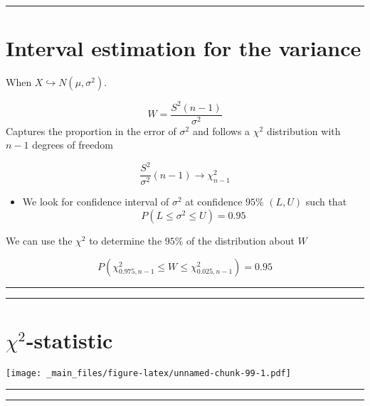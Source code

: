 \documentclass[
]{book}
\providecommand{\tightlist}{%
  \setlength{\itemsep}{0pt}\setlength{\parskip}{0pt}}
\begin{document}
\begin{center}\rule{0.5\linewidth}{0.5pt}\end{center}

\hypertarget{interval-estimation-for-the-variance-1}{%
\section{Interval estimation for the variance}\label{interval-estimation-for-the-variance-1}}

When \(X \hookrightarrow N(\mu, \sigma^2)\).

\[W=\frac{S^2(n-1)}{\sigma^2}\]
Captures the proportion in the error of \(\sigma^2\) and
follows a \(\chi^2\) distribution with \(n-1\) degrees of freedom

\[\frac{S^2}{\sigma^2}(n-1)\rightarrow \chi^2_{n-1}\]

\begin{itemize}
\tightlist
\item
  We look for confidence interval of \(\sigma^2\) at confidence \(95\%\) \((L,U)\) such that \[P(L \leq \sigma^2 \leq U)=0.95\]
\end{itemize}

We can use the \(\chi^2\) to determine the \(95\%\) of the distribution about \(W\)

\[P(\chi^2_{0.975,n-1} \leq W \leq \chi^2_{0.025,n-1})=0.95\]

\begin{center}\rule{0.5\linewidth}{0.5pt}\end{center}

\begin{center}\rule{0.5\linewidth}{0.5pt}\end{center}

\hypertarget{chi2-statistic-2}{%
\section{\texorpdfstring{\(\chi^2\)-statistic}{\textbackslash chi\^{}2-statistic}}\label{chi2-statistic-2}}

\texttt{[image: \_main\_files/figure-latex/unnamed-chunk-99-1.pdf]}

\begin{center}\rule{0.5\linewidth}{0.5pt}\end{center}

\begin{center}\rule{0.5\linewidth}{0.5pt}\end{center}
\end{document}

